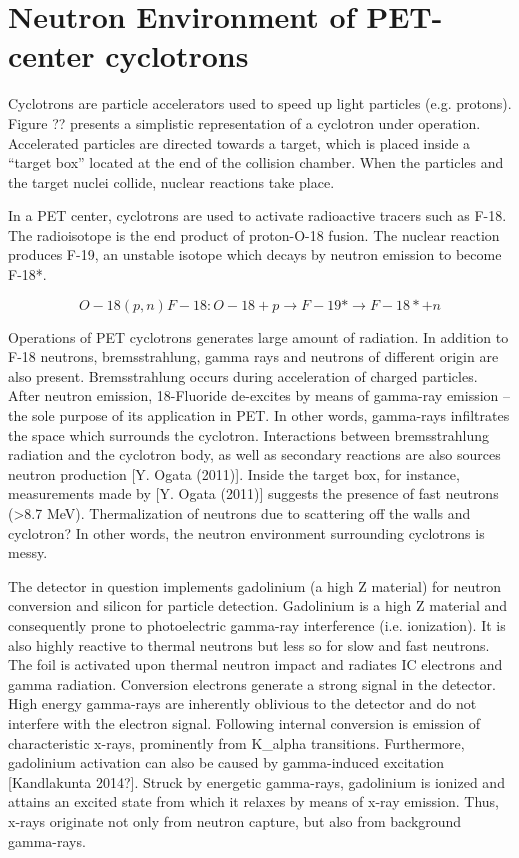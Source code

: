 \section{Neutron Environment of PET-center cyclotrons}
Cyclotrons are particle accelerators used to speed up light particles (e.g. protons). Figure ?? presents a simplistic representation of a cyclotron under operation. Accelerated particles are directed towards a target, which is placed inside a “target box” located at the end of the collision chamber. When the particles and the target nuclei collide, nuclear reactions take place.


In a PET center, cyclotrons are used to activate radioactive tracers such as F-18. The radioisotope is the end product of proton-O-18 fusion. The nuclear reaction produces F-19, an unstable isotope which decays by neutron emission to become F-18*.

    \begin{equation}
    O-18(p,n)F-18: O-18 + p \rightarrow F-19* \rightarrow F-18*+n
    \end{equation}

Operations of PET cyclotrons generates large amount of radiation. In addition to F-18 neutrons, bremsstrahlung, gamma rays and neutrons of different origin are also present. Bremsstrahlung occurs during acceleration of charged particles. After neutron emission, 18-Fluoride de-excites by means of gamma-ray emission – the sole purpose of its application in PET. In other words, gamma-rays infiltrates the space which surrounds the cyclotron.
Interactions between bremsstrahlung radiation and the cyclotron body, as well as secondary reactions are also sources neutron production [Y. Ogata (2011)]. Inside the target box, for instance, measurements made by [Y. Ogata (2011)] suggests the presence of fast neutrons (>8.7 MeV). Thermalization of neutrons due to scattering off the walls and cyclotron? In other words, the neutron environment surrounding cyclotrons is messy.

The detector in question implements gadolinium (a high Z material) for neutron conversion and silicon for particle detection. Gadolinium is a high Z material and consequently prone to photoelectric gamma-ray interference (i.e. ionization). It is also highly reactive to thermal neutrons but less so for slow and fast neutrons.
The foil is activated upon thermal neutron impact and radiates IC electrons and gamma radiation. Conversion electrons generate a strong signal in the detector. High energy gamma-rays are inherently oblivious to the detector and do not interfere with the electron signal.
Following internal conversion is emission of characteristic x-rays, prominently from K_alpha transitions. Furthermore, gadolinium activation can also be caused by gamma-induced excitation [Kandlakunta 2014?]. Struck by energetic gamma-rays, gadolinium is ionized and attains an excited state from which it relaxes by means of x-ray emission. Thus, x-rays originate not only from neutron capture, but also from background gamma-rays.

